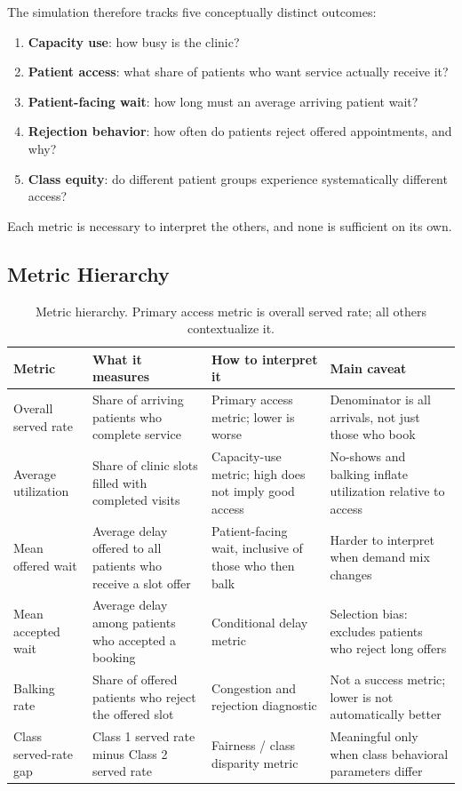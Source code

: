 \documentclass[11pt]{article}
\begin{document}
The simulation therefore tracks five conceptually distinct outcomes:
\begin{enumerate}
    \item \textbf{Capacity use}: how busy is the clinic?
    \item \textbf{Patient access}: what share of patients who want service
    actually receive it?
    \item \textbf{Patient-facing wait}: how long must an average arriving
    patient wait?
    \item \textbf{Rejection behavior}: how often do patients reject offered
    appointments, and why?
    \item \textbf{Class equity}: do different patient groups experience
    systematically different access?
\end{enumerate}

Each metric is necessary to interpret the others, and none is sufficient
on its own.

\subsection*{Metric Hierarchy}

\begin{table}[H]
\centering
\renewcommand{\arraystretch}{1.2}
\begin{tabular}{p{}p{}p{}p{}}
\toprule
Metric & What it measures & How to interpret it & Main caveat \\
\midrule
Overall served rate & Share of arriving patients who complete service & Primary access metric; lower is worse & Denominator is all arrivals, not just those who book \\
Average utilization & Share of clinic slots filled with completed visits & Capacity-use metric; high does not imply good access & No-shows and balking inflate utilization relative to access \\
Mean offered wait & Average delay offered to all patients who receive a slot offer & Patient-facing wait, inclusive of those who then balk & Harder to interpret when demand mix changes \\
Mean accepted wait & Average delay among patients who accepted a booking & Conditional delay metric & Selection bias: excludes patients who reject long offers \\
Balking rate & Share of offered patients who reject the offered slot & Congestion and rejection diagnostic & Not a success metric; lower is not automatically better \\
Class served-rate gap & Class 1 served rate minus Class 2 served rate & Fairness / class disparity metric & Meaningful only when class behavioral parameters differ \\
\bottomrule
\end{tabular}
\caption{Metric hierarchy. Primary access metric is overall served rate; all
others contextualize it.}
\label{tab:metric-hierarchy}
\end{table}
\end{document}
